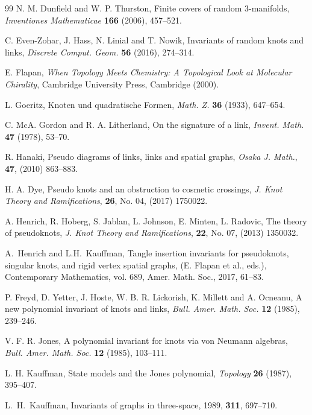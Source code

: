 \documentclass[a4paper, reqno, 12pt]{amsart}
\theoremstyle{plain}
\theoremstyle{definition}
\begin{document}
\begin{thebibliography}{99}
 {\sc N. M. Dunfield and W. P. Thurston}, Finite covers of random 3-manifolds, \emph{Inventiones Mathematicae} \textbf{166} (2006), 457--521.

{\sc C. Even-Zohar, J. Hass, N. Linial and T. Nowik},
Invariants of random knots and links,
{\it Discrete Comput. Geom.} {\bf 56} (2016), 274--314.

 {\sc E. Flapan}, {\em When Topology Meets Chemistry: A Topological Look at Molecular Chirality}, 
Cambridge University Press, Cambridge (2000).

{\sc L. Goeritz},
Knoten und quadratische Formen,
{\it Math. Z.} {\bf 36} (1933), 647--654.

{\sc C. McA. Gordon and R. A. Litherland},
On the signature of a link,
{\it Invent. Math.} {\bf 47} (1978), 53--70.

 {\sc R. Hanaki}, Pseudo diagrams of links, links and spatial graphs, {\it Osaka J. Math.}, {\bf 47}, (2010) 863--883.

 {\sc H. A. Dye}, Pseudo knots and an obstruction to cosmetic crossings, {\it J. Knot Theory and Ramifications}, {\bf 26}, No. 04, (2017) 1750022.

 {\sc A. Henrich, R. Hoberg, S. Jablan, L. Johnson, E. Minten, L. Radovic}, The theory of pseudoknots, {\it J. Knot Theory and Ramifications}, {\bf 22}, No. 07, (2013) 1350032.

A.~Henrich and L.H.~Kauffman,
\newblock Tangle insertion invariants for pseudoknots, singular knots, and rigid vertex spatial graphs,
 (E. Flapan et al., eds.), 
\newblock Contemporary Mathematics, vol. 689, Amer. Math. Soc., 2017, 61--83.

{\sc P. Freyd, D. Yetter, J. Hoste, W. B. R. Lickorish, K. Millett and A. Ocneanu},
A new polynomial invariant of knots and links,
{\it Bull. Amer. Math. Soc.} {\bf 12} (1985), 239--246.

{\sc V. F. R. Jones},
A polynomial invariant for knots via von Neumann algebras,
{\it Bull. Amer. Math. Soc.} {\bf 12} (1985), 103--111.

 {\sc L. H. Kauffman}, State models and the Jones polynomial, \textit{Topology} \textbf{26} (1987), 395--407.

L.~H.~Kauffman,
\newblock Invariants of graphs in three-space,
 1989, \textbf{311}, 697--710.


\end{thebibliography}
\end{document}
